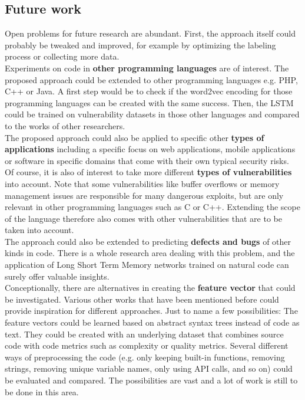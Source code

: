 \documentclass[
	a4paper,
	pagesize,
	pdftex,
	12pt,
	twoside, %
	BCOR=5mm, %
	ngerman,
	fleqn,
	final,
	]{scrartcl}
\begin{document}
\subsection{Future work}
Open problems for future research are abundant. First, the approach itself could probably be tweaked and improved, for example by optimizing the labeling process or collecting more data.\\
Experiments on code in \textbf{other programming languages} are of interest. The proposed approach could be extended to other programming languages e.g. PHP, C++ or Java. A first step would be to check if the word2vec encoding for those programming languages can be created with the same success. Then, the LSTM could be trained on vulnerability datasets in those other languages and compared to the works of other researchers. \\
The proposed approach could also be applied to specific other \textbf{types of applications} including a specific focus on web applications, mobile applications or software in specific domains that come with their own typical security risks.\\
Of course, it is also of interest to take more different \textbf{types of vulnerabilities} into account. Note that some vulnerabilities like buffer overflows or memory management issues are responsible for many dangerous exploits, but are only relevant in other programming languages such as C or C++. Extending the scope of the language therefore also comes with other vulnerabilities that are to be taken into account.\\
The approach could also be extended to predicting \textbf{defects and bugs} of other kinds in code. There is a whole research area dealing with this problem, and the application of Long Short Term Memory networks trained on natural code can surely offer valuable insights.\\
Conceptionally, there are alternatives in creating the \textbf{feature vector} that could be investigated. Various other works that have been mentioned before could provide inspiration for different approaches. Just to name a few possibilities: The feature vectors could be learned based on abstract syntax trees instead of code as text. They could be created with an underlying dataset that combines source code with code metrics such as complexity or quality metrics. Several different ways of preprocessing the code (e.g. only keeping built-in functions, removing strings, removing unique variable names, only using API calls, and so on) could be evaluated and compared. The possibilities are vast and a lot of work is still to be done in this area.\\
\end{document}

